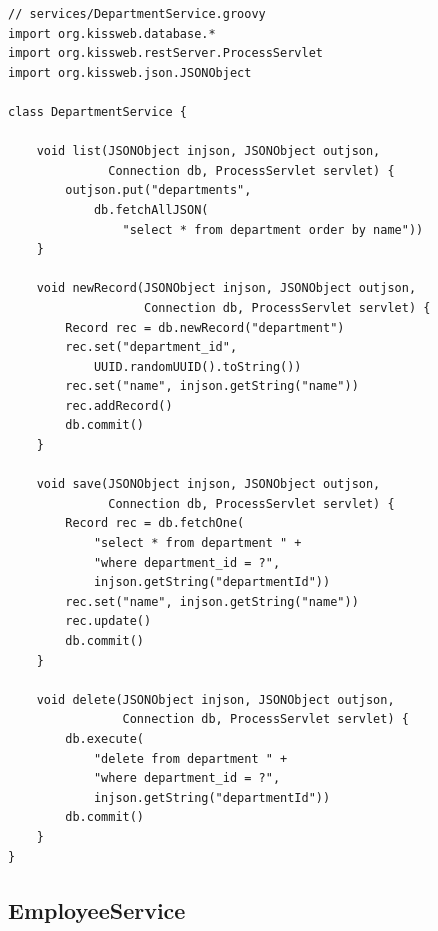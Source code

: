 \begin{lstlisting}[style=groovy]
// services/DepartmentService.groovy
import org.kissweb.database.*
import org.kissweb.restServer.ProcessServlet
import org.kissweb.json.JSONObject

class DepartmentService {

    void list(JSONObject injson, JSONObject outjson,
              Connection db, ProcessServlet servlet) {
        outjson.put("departments",
            db.fetchAllJSON(
                "select * from department order by name"))
    }

    void newRecord(JSONObject injson, JSONObject outjson,
                   Connection db, ProcessServlet servlet) {
        Record rec = db.newRecord("department")
        rec.set("department_id",
            UUID.randomUUID().toString())
        rec.set("name", injson.getString("name"))
        rec.addRecord()
        db.commit()
    }

    void save(JSONObject injson, JSONObject outjson,
              Connection db, ProcessServlet servlet) {
        Record rec = db.fetchOne(
            "select * from department " +
            "where department_id = ?",
            injson.getString("departmentId"))
        rec.set("name", injson.getString("name"))
        rec.update()
        db.commit()
    }

    void delete(JSONObject injson, JSONObject outjson,
                Connection db, ProcessServlet servlet) {
        db.execute(
            "delete from department " +
            "where department_id = ?",
            injson.getString("departmentId"))
        db.commit()
    }
}
\end{lstlisting}

\subsection{EmployeeService}

